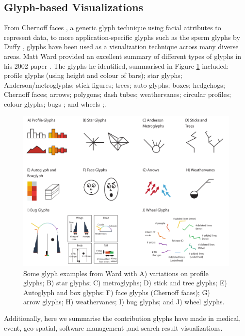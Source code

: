 \subsection{Glyph-based Visualizations}
\label{sec:glyph-examples}
From Chernoff faces \cite{chernoff1973use}, a generic glyph technique using facial attributes to represent data, to more application-specific glyphs such as the sperm glyphs by Duffy \etal \cite{Duffy:2014:TVCG}, glyphs have been used as a visualization technique across many diverse areas. 
Matt Ward provided an excellent summary of different types of glyphs in his 2002 paper \cite{ward02}.
The glyphs he identified, summarised in Figure \ref{fig:wardglyphs} included: profile glyphs (using height and colour of bars); star glyphs; Anderson/metroglyphs; stick figures; trees; auto glyphs; boxes; hedgehogs; Chernoff faces; arrows; polygons; dash tubes; weathervanes; circular profiles; colour glyphs; bugs \cite{chuah1998}; and wheels \cite{chuah1998};.

\begin{figure}[h!]
\centering
\includegraphics[width=\textwidth]{images/related-work/glyphs/glyphs_ward}
\caption{Some glyph examples from Ward \cite{ward02} with A) variations on profile glyphs; B) star glyphs; C) metroglyphs; D) stick and tree glyphs; E) Autoglyph and box glyphs: F) face glyphs (Chernoff faces); G) arrow glyphs; H) weathervanes; I) bug glyphs; and J) wheel glyphs.}
\label{fig:wardglyphs}
\end{figure}
 
Additionally, here we summarise the contribution glyphs have made in medical, event, geo-spatial, software management ,and search result visualizations.

